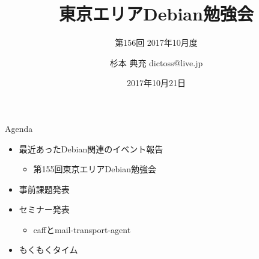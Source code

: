 \title{東京エリアDebian勉強会}
\subtitle{第156回 2017年10月度}
\author{杉本 典充  dictoss@live.jp}
\date{2017年10月21日}



\begin{frame}
\titlepage{}
\end{frame}

\begin{frame}{Agenda}
 \begin{minipage}[t]{0.45\hsize}
  \begin{itemize}
  \item 最近あったDebian関連のイベント報告
    \begin{itemize}
    \item 第155回東京エリアDebian勉強会
    \end{itemize}
  \item 事前課題発表
  \end{itemize}
 \end{minipage}
 \begin{minipage}[t]{0.45\hsize}
  \begin{itemize}
  \item セミナー発表
    \begin{itemize}
    \item caffとmail-transport-agent
    \end{itemize}
  \item もくもくタイム
  \end{itemize}
 \end{minipage}
\end{frame}

